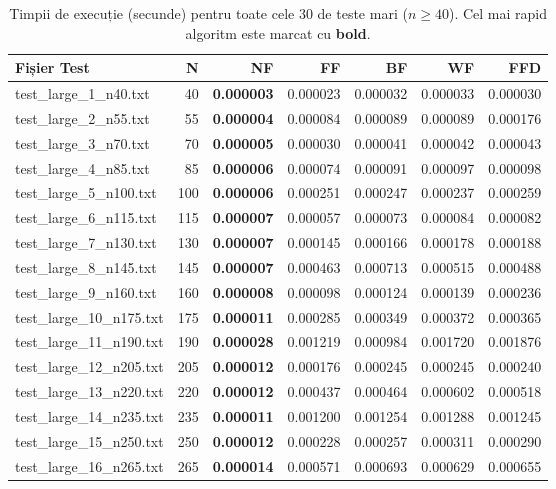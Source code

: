 \documentclass[runningheads]{llncs}
\begin{document}
\begin{table}[H]
\centering
\caption{Timpii de execuție (secunde) pentru toate cele 30 de teste mari ($n \geq 40$). Cel mai rapid algoritm este marcat cu \textbf{bold}.}
\label{tab:times_large}
\scriptsize
\begin{tabular}{|l|r|r|r|r|r|r|}
\hline
\textbf{Fișier Test} & \textbf{N} & \textbf{NF} & \textbf{FF} & \textbf{BF} & \textbf{WF} & \textbf{FFD} \\
\hline
test\_large\_1\_n40.txt & 40 & \textbf{0.000003} & 0.000023 & 0.000032 & 0.000033 & 0.000030 \\
test\_large\_2\_n55.txt & 55 & \textbf{0.000004} & 0.000084 & 0.000089 & 0.000089 & 0.000176 \\
test\_large\_3\_n70.txt & 70 & \textbf{0.000005} & 0.000030 & 0.000041 & 0.000042 & 0.000043 \\
test\_large\_4\_n85.txt & 85 & \textbf{0.000006} & 0.000074 & 0.000091 & 0.000097 & 0.000098 \\
test\_large\_5\_n100.txt & 100 & \textbf{0.000006} & 0.000251 & 0.000247 & 0.000237 & 0.000259 \\
test\_large\_6\_n115.txt & 115 & \textbf{0.000007} & 0.000057 & 0.000073 & 0.000084 & 0.000082 \\
test\_large\_7\_n130.txt & 130 & \textbf{0.000007} & 0.000145 & 0.000166 & 0.000178 & 0.000188 \\
test\_large\_8\_n145.txt & 145 & \textbf{0.000007} & 0.000463 & 0.000713 & 0.000515 & 0.000488 \\
test\_large\_9\_n160.txt & 160 & \textbf{0.000008} & 0.000098 & 0.000124 & 0.000139 & 0.000236 \\
test\_large\_10\_n175.txt & 175 & \textbf{0.000011} & 0.000285 & 0.000349 & 0.000372 & 0.000365 \\
test\_large\_11\_n190.txt & 190 & \textbf{0.000028} & 0.001219 & 0.000984 & 0.001720 & 0.001876 \\
test\_large\_12\_n205.txt & 205 & \textbf{0.000012} & 0.000176 & 0.000245 & 0.000245 & 0.000240 \\
test\_large\_13\_n220.txt & 220 & \textbf{0.000012} & 0.000437 & 0.000464 & 0.000602 & 0.000518 \\
test\_large\_14\_n235.txt & 235 & \textbf{0.000011} & 0.001200 & 0.001254 & 0.001288 & 0.001245 \\
test\_large\_15\_n250.txt & 250 & \textbf{0.000012} & 0.000228 & 0.000257 & 0.000311 & 0.000290 \\
test\_large\_16\_n265.txt & 265 & \textbf{0.000014} & 0.000571 & 0.000693 & 0.000629 & 0.000655 \\

\end{tabular}
\end{table}
\end{document}
